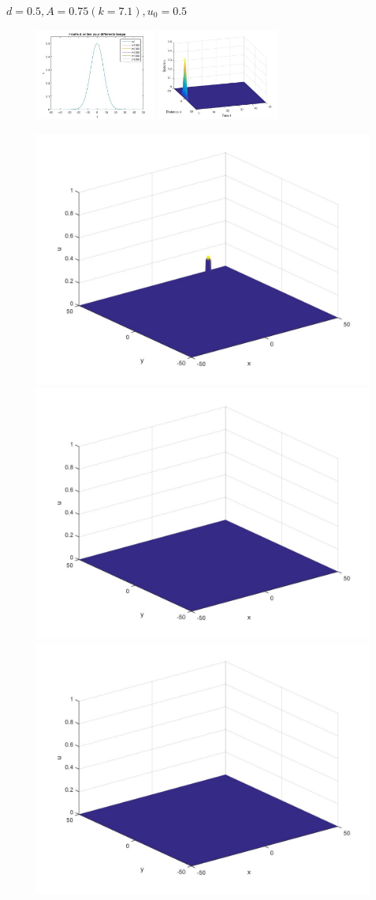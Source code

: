 \documentclass[10pt]{beamer}
\begin{document}
\begin{frame}{$\ d=0.5, A=0.75 (k=7.1), u_0=0.5$}{}
\begin{figure}[H]
	\centering
	\includegraphics[width=0.40\linewidth, height=3cm]{Allee/F2322}\hfill
	\includegraphics[width=0.55\linewidth, height=3cm]{Allee/F4322}
\end{figure}
\begin{figure}[H]
	\centering
	\includegraphics[width=0.3\linewidth]{Allee/322__1_}\hfill
    \includegraphics[width=0.3\linewidth]{Allee/322__2_}\hfill
	\includegraphics[width=0.3\linewidth]{Allee/322__3_}
\end{figure}
\end{frame}
\end{document}
